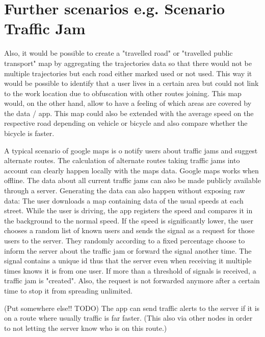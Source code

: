 \section{Further scenarios e.g. Scenario Traffic Jam}
Also, it would be possible to create a "travelled road" or "travelled public transport" map by aggregating the trajectories data so that there would not be multiple trajectories but each road either marked used or not used. This way it would be possible to identify that a user lives in a certain area but could not link to the work location due to obfuscation with other routes joining. This map would, on the other hand, allow to have a feeling of which areas are covered by the data / app. This map could also be extended with the average speed on the respective road depending on vehicle or bicycle and also compare whether the bicycle is faster.

A typical scenario of google maps is o notify users about traffic jams and suggest alternate routes. The calculation of alternate routes taking traffic jams into account can clearly happen locally with the maps data. Google maps works when offline. The data about all current traffic jams can also be made publicly available through a server. Generating the data can also happen without exposing raw data: The user downloads a map containing data of the usual speeds at each street. While the user is driving, the app registers the speed and compares it in the background to the normal speed. If the speed is significantly lower, the user chooses a random list of known users and sends the signal as a request for those users to the server. They randomly according to a fixed percentage choose to inform the server about the traffic jam or forward the signal another time. The signal contains a unique id thus that the server even when receiving it multiple times knows it is from one user. If more than a threshold of signals is received, a traffic jam is "created". Also, the request is not forwarded anymore after a certain time to stop it from spreading unlimited.

(Put somewhere else!! TODO) The app can send traffic alerts to the server if it is on a route where usually traffic is far faster. (This also via other nodes in order to not letting the server know who is on this route.)
